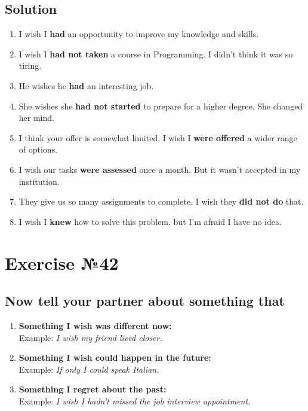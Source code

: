 \subsection*{Solution}
\begin{enumerate}
      \item I wish I \textbf{had} an opportunity to improve my knowledge and skills.
      \item I wish I \textbf{had not taken} a course in Programming. I didn’t think it was so tiring.
      \item He wishes he \textbf{had} an interesting job.
      \item She wishes she \textbf{had not started} to prepare for a higher degree. She changed her mind.
      \item I think your offer is somewhat limited. I wish I \textbf{were offered} a wider range of options.
      \item I wish our tasks \textbf{were assessed} once a month. But it wasn’t accepted in my institution.
      \item They give us so many assignments to complete. I wish they \textbf{did not do} that.
      \item I wish I \textbf{knew} how to solve this problem, but I’m afraid I have no idea.
\end{enumerate}

\section{Exercise №42}
\subsection*{Now tell your partner about something that}
\begin{enumerate}
      \item \textbf{Something I wish was different now:} \\
            Example: \textit{I wish my friend lived closer.}

      \item \textbf{Something I wish could happen in the future:} \\
            Example: \textit{If only I could speak Italian.}

      \item \textbf{Something I regret about the past:} \\
            Example: \textit{I wish I hadn't missed the job interview appointment.}
\end{enumerate}

